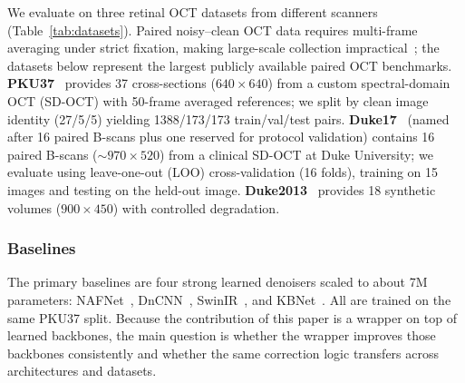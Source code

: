 \documentclass{ieeetj}
\begin{document}
We evaluate on three retinal OCT datasets from different scanners (Table~\ref{tab:datasets}). Paired noisy--clean OCT data requires multi-frame averaging under strict fixation, making large-scale collection impractical~\cite{geng2022triplet}; the datasets below represent the largest publicly available paired OCT benchmarks. \textbf{PKU37}~\cite{geng2022triplet} provides 37 cross-sections ($640{\times}640$) from a custom spectral-domain OCT (SD-OCT) with 50-frame averaged references; we split by clean image identity (27/5/5) yielding 1388/173/173 train/val/test pairs. \textbf{Duke17}~\cite{fang2012sparsity} (named after 16 paired B-scans plus one reserved for protocol validation) contains 16 paired B-scans (${\sim}970{\times}520$) from a clinical SD-OCT at Duke University; we evaluate using leave-one-out (LOO) cross-validation (16 folds), training on 15 images and testing on the held-out image. \textbf{Duke2013}~\cite{fang2013fast} provides 18 synthetic volumes ($900{\times}450$) with controlled degradation.

\begin{table}[t]
\centering
\caption{Datasets. PKU37 is the in-distribution (ID) domain; Duke17 is the primary cross-dataset benchmark with LOO evaluation.}
\label{tab:datasets}
\end{table}

\subsubsection{Baselines}

The primary baselines are four strong learned denoisers scaled to about 7M parameters: NAFNet~\cite{chen2022simple}, DnCNN~\cite{zhang2017beyond}, SwinIR~\cite{liang2021swinir}, and KBNet~\cite{zhang2023kbnet}. All are trained on the same PKU37 split. Because the contribution of this paper is a wrapper on top of learned backbones, the main question is whether the wrapper improves those backbones consistently and whether the same correction logic transfers across architectures and datasets.
\end{document}
